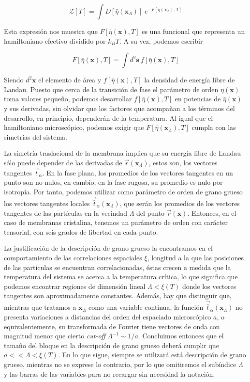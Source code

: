 \begin{equation*}
\mathcal{Z}[T]=\int D[\bar{\eta}(\mathbf{x}_{\Lambda})]\; e^{-F[\bar{\eta}(\mathbf{x}_{\Lambda}),T]}
\end{equation*}

Esta expresión nos muestra que $F[\bar{\eta}(\mathbf{x}),T]$ es una funcional
que representa un hamiltoniano efectivo dividido por $k_BT$. A su vez, podemos
escribir 

\begin{equation*}
F[\bar{\eta}(\mathbf{x}),T]=\int\! d^2\mathbf{s}\ f[\bar{\eta}(\mathbf{x}),T]
\end{equation*}

Siendo $d^2\mathbf{x}$ el elemento de área y $f[\bar{\eta}(\mathbf{x}),T]$ la
densidad de energía libre de Landau. Puesto que cerca de la transición de fase
el parámetro de orden $\bar{\eta}(\mathbf{x})$ toma valores pequeño, podemos
desarrollar $f[\bar{\eta}(\mathbf{x}),T]$ en potencias de
$\bar{\eta}(\mathbf{x})$ y sus derivadas, sin olvidar que los factores que
acompañan a los términos del desarrollo, en principio, dependerán de la
temperatura. Al igual que el hamiltoniano microscópico, podemos exigir que
$F[\bar{\eta}(\mathbf{x}_{\Lambda}),T]$ cumpla con las simetrías del sistema.

La simetría traslacional de la membrana implica que su energía libre de Landau
sólo puede depender de las derivadas de $\vec{r}(\mathbf{x}_{\Lambda})$, estos
son, los vectores tangentes $\vec{t}_{\alpha}$. En la fase
plana, los promedios de los vectores tangentes en un punto son no nulos, en
cambio, en la fase rugosa, su promedio es nulo por isotropía. Por tanto,
podemos utilizar como  parámetro de orden de grano grueso los vectores
tangentes locales $\vec{\bar{t}}_{\alpha}(\mathbf{x}_{\Lambda})$, que serán
los promedios de los vectores tangentes de las partículas en la vecindad
$\Lambda$ del punto $\vec{r}(\mathbf{x})$. Entonces, en el caso de
membranas cristalina, tenemos un parámetro de orden con carácter tensorial,
con seis grados de libertad en cada punto.

La justificación de la descripción de grano grueso la encontramos en el
comportamiento de las correlaciones espaciales $\xi$, longitud a la que las
posiciones de las partículas se encuentran correlacionadas, éstas crecen a
medida que la temperatura del sistema se acerca a la temperatura crítica, lo
que significa que podemos encontrar regiones de dimensión lineal
$\Lambda<\xi(T)$ donde los vectores tangentes son aproximadamente
constantes. Además, hay que distinguir que, mientras que tratamos a
$\mathbf{x}_{\Lambda}$ como una variable continua, la función 
$\vec{\bar{t}}_{\alpha}(\mathbf{x}_{\Lambda})$ no presenta variaciones a distancias
del orden del espaciado microscópico $a$, o equivalentemente, su transformada
de Fourier tiene vectores de onda con magnitud menor que cierto \textit{cut-off}
$\Lambda^{-1} \sim 1/a$. Concluimos entonces que el tamaño del bloque en la
descripción de grano grueso deberá cumplir que $a<<\Lambda<\xi(T)$. En lo que
sigue, siempre se utilizará está descripción de grano grueso, mientras no se
exprese lo contrario, por lo que omitiremos el subíndice $\Lambda$ y las
barras de las variables para no recargar sin necesidad la notación.

